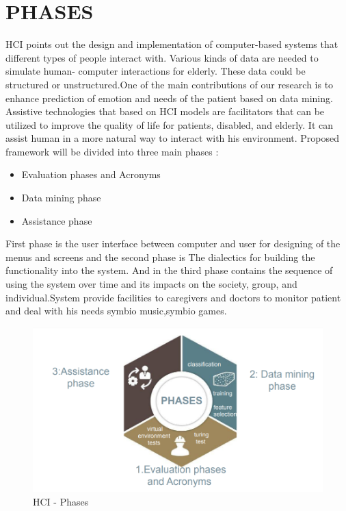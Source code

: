 \section{PHASES}
HCI points out the design and implementation of computer-based systems that  different types of people interact with. Various kinds of data are needed to simulate human- computer interactions for elderly. These data could be structured or unstructured.One of the main contributions of our research is to enhance prediction of emotion and needs of the patient based on data mining. Assistive technologies that based on HCI models are facilitators that can be utilized to improve the quality of life for patients, disabled, and elderly.  It can assist human in a more natural way to interact with his environment. Proposed framework will be divided into three main phases :\\
\begin{itemize}
  \item  Evaluation phases and Acronyms 
  \item  Data mining phase 
\item  Assistance phase

\end{itemize}
First phase is the user interface between computer and user for designing of the menus and screens and the second phase is The dialectics for building the functionality into the system. And in the  third phase contains  the sequence of using the system over time and its impacts on the society, group, and individual.System provide facilities to caregivers and doctors to  monitor patient and deal  with his needs symbio music,symbio games.
\begin{figure}[h]
	\begin{center}
		\includegraphics[width =15.5cm]{2.PNG}
		\caption{HCI - Phases}
		\label{ab}
	\end{center}
\end{figure}
